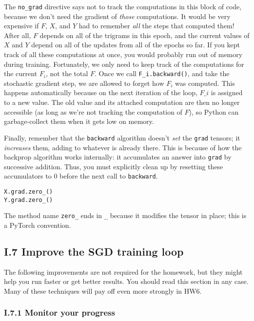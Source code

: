 \documentclass[12pt]{article}
\theoremstyle{plain}
\theoremstyle{definition}
\theoremstyle{remark}
\begin{document}
The \texttt{no\_grad} directive says not to track the computations in this block of code, because we don’t need the gradient of \textit{those} computations. It would be very expensive if $F$, $X$, and $Y$ had to remember \textit{all} the steps that computed them! After all, $F$ depends on all of the trigrams in this epoch, and the current values of $X$ and $Y$ depend on all of the updates from all of the epochs so far. If you kept track of all these computations at once, you would probably run out of memory during training. Fortunately, we only need to keep track of the computations for the current $F_i$, not the total $F$. Once we call \texttt{F\_i.backward()}, and take the stochastic gradient step, we are allowed to forget how $F_i$ was computed. This happens automatically because on the next iteration of the loop, $F\_i$ is assigned to a new value. The old value and its attached computation are then no longer accessible (as long as we’re not tracking the computation of $F$), so Python can garbage-collect them when it gets low on memory.

Finally, remember that the \texttt{backward} algorithm doesn’t \textit{set} the \texttt{grad} tensors; it \textit{increases} them, adding to whatever is already there. This is because of how the backprop algorithm works internally: it accumulates an answer into \texttt{grad} by successive addition. Thus, you must explicitly clean up by resetting these accumulators to 0 before the next call to \texttt{backward}.
\begin{verbatim}
X.grad.zero_()
Y.grad.zero_()
\end{verbatim}

The method name \texttt{zero\_} ends in \texttt{\_} because it modifies the tensor in place; this is a PyTorch convention.

\subsection*{I.7 Improve the SGD training loop}

The following improvements are not required for the homework, but they might help you run faster or get better results. You should read this section in any case. Many of these techniques will pay off even more strongly in HW6.

\subsubsection*{I.7.1 Monitor your progress}
\end{document}
